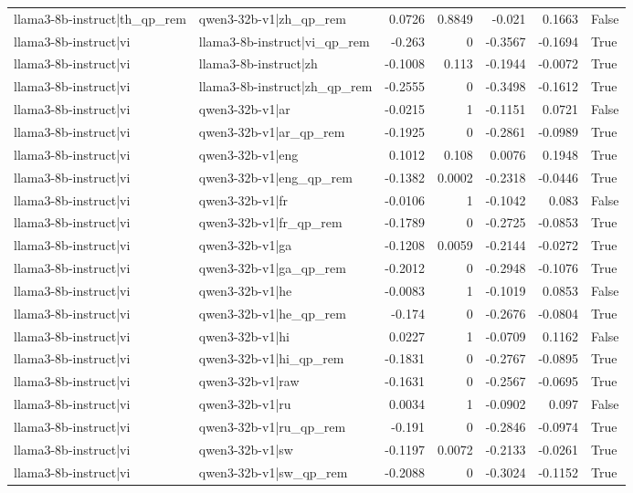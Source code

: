 \begin{table}
\begin{tabular}{l l r r r r l}
llama3-8b-instruct|th_qp_rem & qwen3-32b-v1|zh_qp_rem & 0.0726 & 0.8849 & -0.021 & 0.1663 & False \\
llama3-8b-instruct|vi & llama3-8b-instruct|vi_qp_rem & -0.263 & 0 & -0.3567 & -0.1694 & True \\
llama3-8b-instruct|vi & llama3-8b-instruct|zh & -0.1008 & 0.113 & -0.1944 & -0.0072 & True \\
llama3-8b-instruct|vi & llama3-8b-instruct|zh_qp_rem & -0.2555 & 0 & -0.3498 & -0.1612 & True \\
llama3-8b-instruct|vi & qwen3-32b-v1|ar & -0.0215 & 1 & -0.1151 & 0.0721 & False \\
llama3-8b-instruct|vi & qwen3-32b-v1|ar_qp_rem & -0.1925 & 0 & -0.2861 & -0.0989 & True \\
llama3-8b-instruct|vi & qwen3-32b-v1|eng & 0.1012 & 0.108 & 0.0076 & 0.1948 & True \\
llama3-8b-instruct|vi & qwen3-32b-v1|eng_qp_rem & -0.1382 & 0.0002 & -0.2318 & -0.0446 & True \\
llama3-8b-instruct|vi & qwen3-32b-v1|fr & -0.0106 & 1 & -0.1042 & 0.083 & False \\
llama3-8b-instruct|vi & qwen3-32b-v1|fr_qp_rem & -0.1789 & 0 & -0.2725 & -0.0853 & True \\
llama3-8b-instruct|vi & qwen3-32b-v1|ga & -0.1208 & 0.0059 & -0.2144 & -0.0272 & True \\
llama3-8b-instruct|vi & qwen3-32b-v1|ga_qp_rem & -0.2012 & 0 & -0.2948 & -0.1076 & True \\
llama3-8b-instruct|vi & qwen3-32b-v1|he & -0.0083 & 1 & -0.1019 & 0.0853 & False \\
llama3-8b-instruct|vi & qwen3-32b-v1|he_qp_rem & -0.174 & 0 & -0.2676 & -0.0804 & True \\
llama3-8b-instruct|vi & qwen3-32b-v1|hi & 0.0227 & 1 & -0.0709 & 0.1162 & False \\
llama3-8b-instruct|vi & qwen3-32b-v1|hi_qp_rem & -0.1831 & 0 & -0.2767 & -0.0895 & True \\
llama3-8b-instruct|vi & qwen3-32b-v1|raw & -0.1631 & 0 & -0.2567 & -0.0695 & True \\
llama3-8b-instruct|vi & qwen3-32b-v1|ru & 0.0034 & 1 & -0.0902 & 0.097 & False \\
llama3-8b-instruct|vi & qwen3-32b-v1|ru_qp_rem & -0.191 & 0 & -0.2846 & -0.0974 & True \\
llama3-8b-instruct|vi & qwen3-32b-v1|sw & -0.1197 & 0.0072 & -0.2133 & -0.0261 & True \\
llama3-8b-instruct|vi & qwen3-32b-v1|sw_qp_rem & -0.2088 & 0 & -0.3024 & -0.1152 & True \\

\end{tabular}
\end{table}
